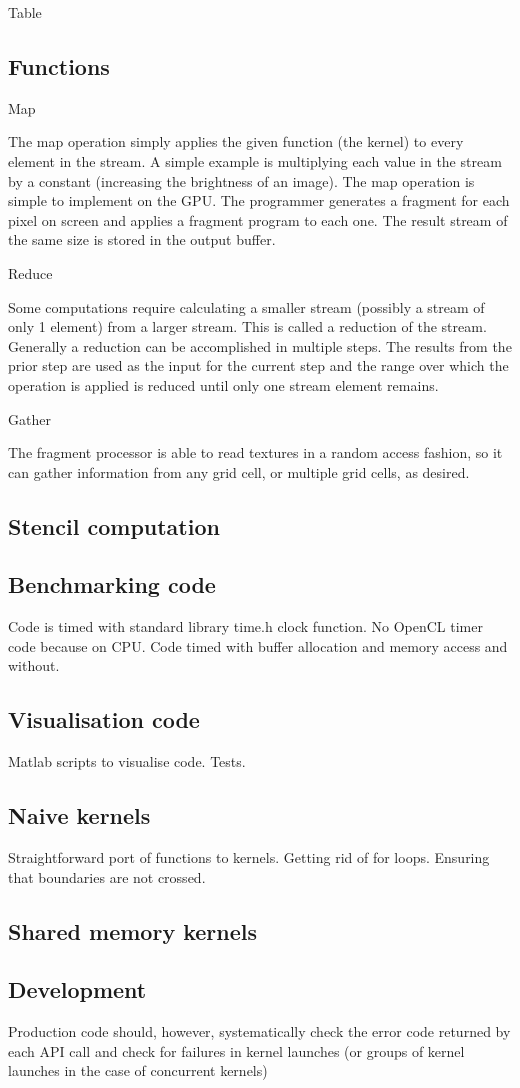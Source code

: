 Table

\subsection{Functions}
Map

The map operation simply applies the given function (the kernel) to every element in the stream. A simple example is multiplying each value in the stream by a constant (increasing the brightness of an image). The map operation is simple to implement on the GPU. The programmer generates a fragment for each pixel on screen and applies a fragment program to each one. The result stream of the same size is stored in the output buffer.


Reduce

Some computations require calculating a smaller stream (possibly a stream of only 1 element) from a larger stream. This is called a reduction of the stream. Generally a reduction can be accomplished in multiple steps. The results from the prior step are used as the input for the current step and the range over which the operation is applied is reduced until only one stream element remains.

Gather

The fragment processor is able to read textures in a random access fashion, so it can gather information from any grid cell, or multiple grid cells, as desired.

\subsection{Stencil computation}


\subsection{Benchmarking code}
Code is timed with standard library time.h clock function.
No OpenCL timer code because on CPU. Code timed with buffer allocation and memory access and without.

\subsection{Visualisation code}
Matlab scripts to visualise code. Tests.

\subsection{Naive kernels}
Straightforward port of functions to kernels. Getting rid of for loops. Ensuring that boundaries are not crossed.


\subsection{Shared memory kernels}

\subsection{Development}
Production code should, however, systematically check the error code returned by each API call and check for failures in kernel launches (or groups of kernel launches in the case of concurrent kernels) 